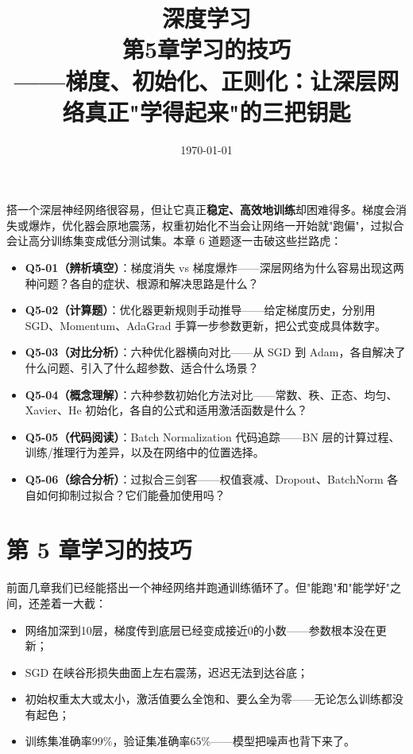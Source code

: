 \documentclass[a4paper,11pt]{ctexart}
\title{\textbf{深度学习\\第5章\quad 学习的技巧}\\[0.5em]
{\large\color{gray}——梯度、初始化、正则化：让深层网络真正"学得起来"的三把钥匙}}
\date{\today}
\begin{document}
\maketitle

\begin{beginnerbox}
    搭一个深层神经网络很容易，但让它真正\textbf{稳定、高效地训练}却困难得多。梯度会消失或爆炸，优化器会原地震荡，权重初始化不当会让网络一开始就"跑偏"，过拟合会让高分训练集变成低分测试集。本章 6 道题逐一击破这些拦路虎：

    \begin{itemize}
        \item \textbf{Q5-01（辨析填空）}：梯度消失 vs 梯度爆炸——深层网络为什么容易出现这两种问题？各自的症状、根源和解决思路是什么？
        \item \textbf{Q5-02（计算题）}：优化器更新规则手动推导——给定梯度历史，分别用 SGD、Momentum、AdaGrad 手算一步参数更新，把公式变成具体数字。
        \item \textbf{Q5-03（对比分析）}：六种优化器横向对比——从 SGD 到 Adam，各自解决了什么问题、引入了什么超参数、适合什么场景？
        \item \textbf{Q5-04（概念理解）}：六种参数初始化方法对比——常数、秩、正态、均匀、Xavier、He 初始化，各自的公式和适用激活函数是什么？
        \item \textbf{Q5-05（代码阅读）}：Batch Normalization 代码追踪——BN 层的计算过程、训练/推理行为差异，以及在网络中的位置选择。
        \item \textbf{Q5-06（综合分析）}：过拟合三剑客——权值衰减、Dropout、BatchNorm 各自如何抑制过拟合？它们能叠加使用吗？
    \end{itemize}
\end{beginnerbox}

\section{第 5 章\quad 学习的技巧}

前面几章我们已经能搭出一个神经网络并跑通训练循环了。但"能跑"和"能学好"之间，还差着一大截：

\begin{itemize}
    \item 网络加深到10层，梯度传到底层已经变成接近0的小数——参数根本没在更新；
    \item SGD 在峡谷形损失曲面上左右震荡，迟迟无法到达谷底；
    \item 初始权重太大或太小，激活值要么全饱和、要么全为零——无论怎么训练都没有起色；
    \item 训练集准确率99\%，验证集准确率65\%——模型把噪声也背下来了。
\end{itemize}
\end{document}
